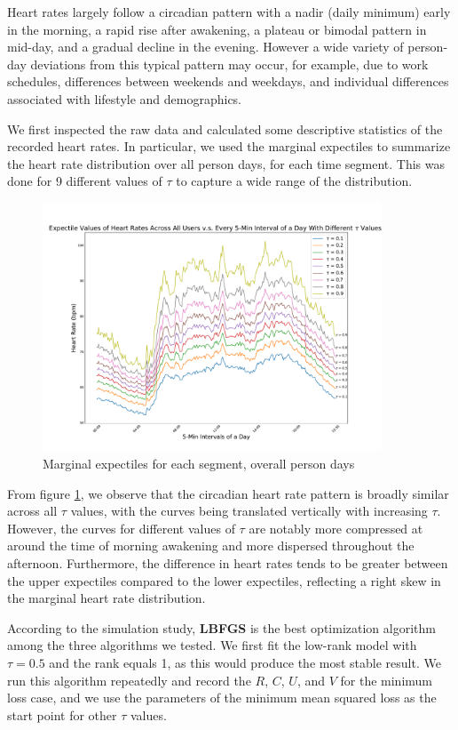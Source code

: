 \documentclass{article}
\begin{document}
Heart rates largely follow a circadian pattern with a nadir (daily minimum) early in the morning, a rapid rise after awakening, a plateau or bimodal pattern in mid-day, and a gradual decline in the evening.  However a wide variety of person-day deviations from this typical pattern may occur, for example, due to work schedules, differences between weekends and weekdays, and individual differences associated with lifestyle and demographics.

We first inspected the raw data and calculated some descriptive statistics of the recorded heart rates.  In particular, we used the marginal expectiles to summarize the heart rate distribution over all person days, for each time segment.  This was done for 9 different values of $\tau$ to capture a wide range of the distribution.


\begin{figure}[ht]
\centering
\includegraphics[width=0.9\textwidth]{expectile_heartrate.pdf} 
\caption{Marginal expectiles for each segment, overall person days} 
\label{expectile heartrate} 
\end{figure}
From figure \ref{expectile heartrate}, we observe that
the circadian heart rate pattern is broadly similar across all $\tau$ values, with the curves being translated vertically with increasing $\tau$.  However, the curves for different values of $\tau$ are notably more compressed at around the time of morning awakening and more dispersed throughout the afternoon.  Furthermore, the difference in heart rates tends to be greater between the upper expectiles compared to the lower expectiles, reflecting a right skew in the marginal heart rate distribution.

According to the simulation study, \textbf{LBFGS} is the best optimization algorithm among the three algorithms we tested. We first fit the low-rank model with $\tau = 0.5$ and the rank equals 1,  as this would produce the most stable result. We run this algorithm repeatedly and record the $R$, $C$, $U$, and $V$ for the minimum loss case, and we use the parameters of the minimum mean squared loss as the start point for other $\tau$ values.
\end{document}
